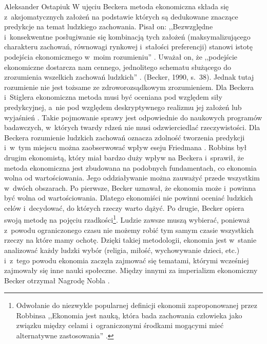 \begin{artplenv}{Aleksander Ostapiuk}
W ujęciu Beckera metoda ekonomiczna składa się z~aksjomatycznych założeń na podstawie których są dedukowane znaczące
predykcje na temat ludzkiego zachowania. Pisał on: ,,Bezwzględne i~konsekwentne posługiwanie się kombinacją tych założeń
(maksymalizującego charakteru zachowań, równowagi rynkowej i~stałości preferencji) stanowi istotę podejścia
ekonomicznego w~moim rozumieniu''
\parencite[s.~23]{becker_ekonomiczna_1990}.
Uważał on, że ,,podejście ekonomiczne
dostarcza nam cennego, jednolitego schematu służącego do zrozumienia wszelkich zachowań ludzkich''
\parencite[s.~38]{becker_ekonomiczna_1990}.
\label{ref:RNDFMM4S6jgqv}(Becker, 1990, s.~38).
Jednak tutaj rozumienie nie jest tożsame ze zdroworozsądkowym
zrozumieniem. Dla Beckera i~Stiglera
\parencite*{becker_gustibus_1977}
ekonomiczna metoda musi być oceniana pod względem
siły predykcyjnej, a~nie pod względem deskryptywnego realizmu jej założeń lub wyjaśnień
\parencite[s.~402–403]{becker_economic_1993}.
Takie pojmowanie sprawy jest odpowiednie do naukowych programów
badawczych, w~których twardy rdzeń nie musi odzwierciedlać rzeczywistości. Dla Beckera rozumienie ludzkich zachowań
oznacza zdolność tworzenia predykcji i~w~tym miejscu można zaobserwować wpływ eseju Friedmana
\parencite*{friedman_essays_1953}.
Robbins był drugim ekonomistą, który miał bardzo duży wpływ na Beckera i~sprawił, że
metoda ekonomiczna jest zbudowana na podobnych fundamentach, co ekonomia wolna od wartościowania. Jego oddziaływanie
można zauważyć przede wszystkim w~dwóch obszarach. Po pierwsze, Becker uznawał, że ekonomia może i~powinna być wolna od
wartościowania. Dlatego ekonomiści nie powinni oceniać ludzkich celów i~decydować, do których rzeczy warto dążyć. Po
drugie, Becker opiera swoją metodę na pojęciu rzadkości\footnote{Odwołanie do niezwykle popularnej definicji ekonomii
zaproponowanej przez Robbinsa ,,Ekonomia jest nauką, która bada zachowania człowieka jako związku między
celami i~ograniczonymi środkami mogącymi mieć alternatywne zastosowania''
\parencite[s.~15]{robbins_essay_1935}.
}.
Ludzie zawsze muszą wybierać, ponieważ z~powodu ograniczonego czasu nie możemy robić tym samym czasie wszystkich rzeczy
na które mamy ochotę. Dzięki takiej metodologii, ekonomia jest w~stanie analizować każdy ludzki wybór (religia, miłość,
wychowywanie dzieci, etc.) i~z~tego powodu ekonomia zaczęła zajmować się tematami, którymi wcześniej zajmowały się inne
nauki społeczne. Między innymi za imperializm ekonomiczny Becker otrzymał Nagrodę Nobla
\parencite[s.~1]{noauthor_royal_1993}.


\end{artplenv}
